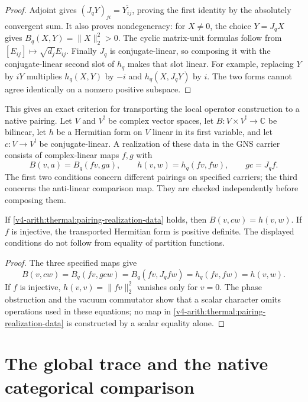 \begin{proof}
Adjoint gives $(J_qY)_{ji}=\overline{Y_{ij}}$, proving the first
identity by the absolutely convergent sum. It also proves
nondegeneracy: for $X\ne0$, the choice $Y=J_qX$ gives
$B_q(X,Y)=\|X\|_2^2>0$. The cyclic matrix-unit formulas follow
from $[E_{ij}]\mapsto\sqrt{d_j}E_{ij}$.
Finally $J_q$ is conjugate-linear, so composing it with the
conjugate-linear second slot of $h_q$ makes that slot linear.
For example, replacing $Y$ by $iY$ multiplies $h_q(X,Y)$ by
$-i$ and $h_q(X,J_qY)$ by $i$. The two forms cannot agree
identically on a nonzero positive subspace.
\end{proof}

This gives an exact criterion for transporting the local operator
construction to a native pairing. Let $V$ and $V^!$ be complex
vector spaces, let $B:V\times V^!\to\mathbb C$ be bilinear,
let $h$ be a Hermitian form on $V$ linear in its first variable,
and let $c:V\to V^!$ be conjugate-linear. A realization of these
data in the GNS carrier consists of complex-linear maps $f,g$
with
\begin{equation}
 B(v,a)=B_q(fv,ga),\qquad
 h(v,w)=h_q(fv,fw),\qquad gc=J_qf.
 \label{v4-arith:thermal:pairing-realization-data}
\end{equation}
The first two conditions concern different pairings on specified
carriers; the third concerns the anti-linear comparison map.
They are checked independently before composing them.

\begin{proposition}
\label{v4-arith:thermal:pairing-transfer}
If \eqref{v4-arith:thermal:pairing-realization-data} holds, then
$B(v,cw)=h(v,w)$. If $f$ is injective, the transported Hermitian
form is positive definite. The displayed conditions do not follow
from equality of partition functions.
\end{proposition}

\begin{proof}
The three specified maps give
\[
 B(v,cw)=B_q(fv,gcw)=B_q(fv,J_qfw)=h_q(fv,fw)=h(v,w).
\]
If $f$ is injective, $h(v,v)=\|fv\|_2^2$ vanishes only for
$v=0$. The phase obstruction and the vacuum commutator show that
a scalar character omits operations used in these equations;
no map in \eqref{v4-arith:thermal:pairing-realization-data} is
constructed by a scalar equality alone.
\end{proof}

\section{The global trace and the native categorical comparison}

